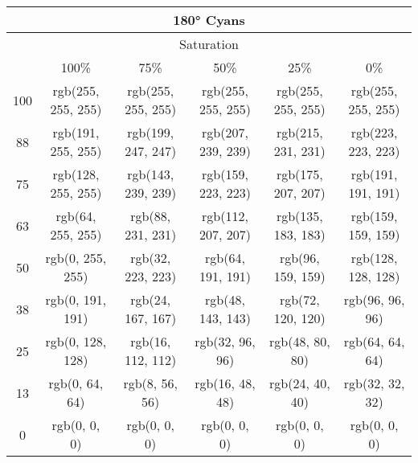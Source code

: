 \documentclass[a4j]{jarticle}
\begin{document}
\begin{tabular}{|c|c|c|c|c|c|}
\multicolumn{6}{|c|}{180°
 Cyans}\\\hline\multicolumn{6}{|c|}{Saturation}\\\hline&100\%&75\%&50\%&25\%&0\%\\\hline100&rgb(255,
     255, 255)&rgb(255, 255, 255)&rgb(255, 255, 255)&rgb(255, 255,
                 255)&rgb(255, 255, 255)\\\hline88&rgb(191, 255,
     255)&rgb(199, 247, 247)&rgb(207, 239, 239)&rgb(215, 231,
                 231)&rgb(223, 223, 223)\\\hline75&rgb(128, 255,
     255)&rgb(143, 239, 239)&rgb(159, 223, 223)&rgb(175, 207,
                 207)&rgb(191, 191, 191)\\\hline63&rgb(64, 255,
     255)&rgb(88, 231, 231)&rgb(112, 207, 207)&rgb(135, 183,
                 183)&rgb(159, 159, 159)\\\hline50&rgb(0, 255,
     255)&rgb(32, 223, 223)&rgb(64, 191, 191)&rgb(96, 159, 159)&rgb(128,
                     128, 128)\\\hline38&rgb(0, 191, 191)&rgb(24, 167,
         167)&rgb(48, 143, 143)&rgb(72, 120, 120)&rgb(96, 96,
                     96)\\\hline25&rgb(0, 128, 128)&rgb(16, 112,
         112)&rgb(32, 96, 96)&rgb(48, 80, 80)&rgb(64, 64,
                     64)\\\hline13&rgb(0, 64, 64)&rgb(8, 56, 56)&rgb(16,
             48, 48)&rgb(24, 40, 40)&rgb(32, 32, 32)\\\hline0&rgb(0, 0,
     0)&rgb(0, 0, 0)&rgb(0, 0, 0)&rgb(0, 0, 0)&rgb(0, 0, 0) 
\end{tabular}
\end{document}
